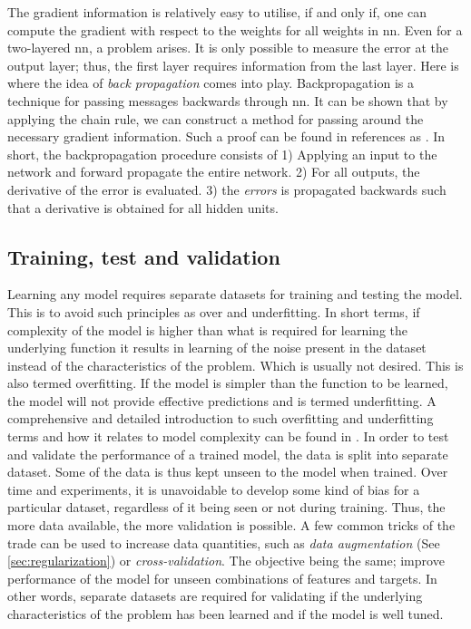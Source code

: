 The gradient information is relatively easy to utilise, if and only if, one can compute the gradient with respect to the weights for all weights in \gls{nn}. Even for a two-layered \gls{nn}, a problem arises. It is only possible to measure the error at the output layer; thus, the first layer requires information from the last layer. Here is where the idea of \emph{back propagation} comes into play. Backpropagation is a technique for passing messages backwards through \gls{nn}. It can be shown that by applying the chain rule, we can construct a method for passing around the necessary gradient information. Such a proof can be found in references as \cite{Nielsen2015, M.Bishop2006}. In short, the backpropagation procedure consists of 1) Applying an input to the network and forward propagate the entire network. 2) For all outputs, the derivative of the error is evaluated. 3) the \emph{errors} is propagated backwards such that a derivative is obtained for all hidden units. 
 



\subsection{Training, test and validation}
Learning any model requires separate datasets for training and testing the model. This is to avoid such principles as over and underfitting. In short terms, if complexity of the model is higher than what is required for learning the underlying function it results in learning of the noise present in the dataset instead of the characteristics of the problem. Which is usually not desired. This is also termed overfitting. If the model is simpler than the function to be learned, the model will not provide effective predictions and is termed underfitting. A comprehensive and detailed introduction to such overfitting and underfitting terms and how it relates to model complexity can be found in \cite{M.Bishop2006}. In order to test and validate the performance of a trained model, the data is split into separate dataset. Some of the data is thus kept unseen to the model when trained. Over time and experiments, it is unavoidable to develop some kind of bias for a particular dataset, regardless of it being seen or not during training. Thus, the more data available, the more validation is possible. A few common tricks of the trade can be used to increase data quantities, such as \emph{data augmentation} (See \ref{sec:regularization}) or \emph{cross-validation}. The objective being the same; improve performance of the model for unseen combinations of features and targets. In other words, separate datasets are required for validating if the underlying characteristics of the problem has been learned and if the model is well tuned.

